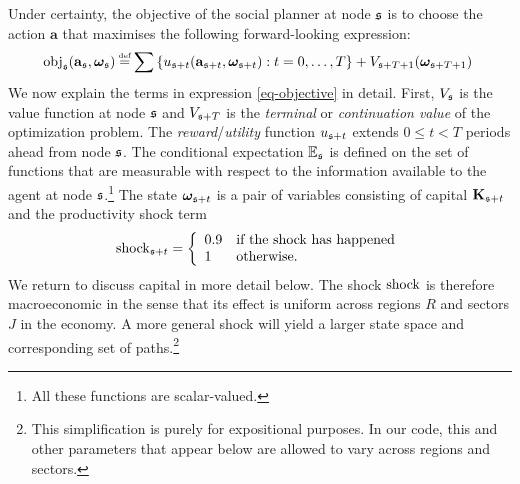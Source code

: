 \documentclass[12pt,a4paper,twoside, draft]{article}
\begin{document}
Under certainty, the objective of the social planner at node $\mathfrak{s}$ is to
choose the action $\mathbf{a}$ that maximises the following forward-looking expression:
\begin{align}\label{eq-objective} \hskip-3pt   
  \textup{obj}_{\node}(\mathbf{a}_{\node}, \boldsymbol{\omega}_{\node}) \defeq
    \sum\left\{
      {u}_{\node + t}(\mathbf{a}_{\node + t}, \boldsymbol{\omega}_{\node + t})
      : t = 0, \dots, T
    \right\}
    + {V}_{\node + T + 1}(\boldsymbol{\omega}_{\node + T + 1})
\end{align}
We now explain the terms in expression \eqref{eq-objective} in detail.
First, ${V}_{\mathfrak{s}}$ is the value function at node $\mathfrak{s}$ and
${V}_{\mathfrak{s} + T}$ is the \emph{terminal} or \emph{continuation value} of the
optimization problem.
The \emph{reward}/\emph{utility} function ${u}_{\mathfrak{s} + t}$ extends
$0 \leq t < T$ periods ahead from node $\mathfrak{s}$.
The conditional expectation $\mathbb{E}_{\mathfrak{s}}$ is defined on the set of functions
that are measurable with respect to the information available to the agent at 
node $\mathfrak{s}$.\footnote{
   All these functions are scalar-valued.
}
The state $\boldsymbol{\omega}_{\mathfrak{s} + t} $ is a pair of variables consisting  of capital
$\mathbf{K}_{\mathfrak{s} + t}$ and the productivity shock term
\begin{equation}
  \textup{shock}_{\mathfrak{s} + t} = \left\{
    \begin{array}{ll}
       0.9 & \textup{if the shock has happened}\\
       1 & \textup{otherwise.}
    \end{array}\right.
\end{equation}
We return to discuss capital in more detail below.
The shock $\textup{shock}$ is therefore macroeconomic in the sense that
its effect is uniform across regions $R$ and sectors $J$ in the economy.
A more general shock will yield a larger state space and corresponding set of
paths.\footnote{
   This simplification is purely for expositional purposes.
   In our code, this and other parameters that appear below are allowed to vary 
   across regions and sectors.
}
\end{document}

